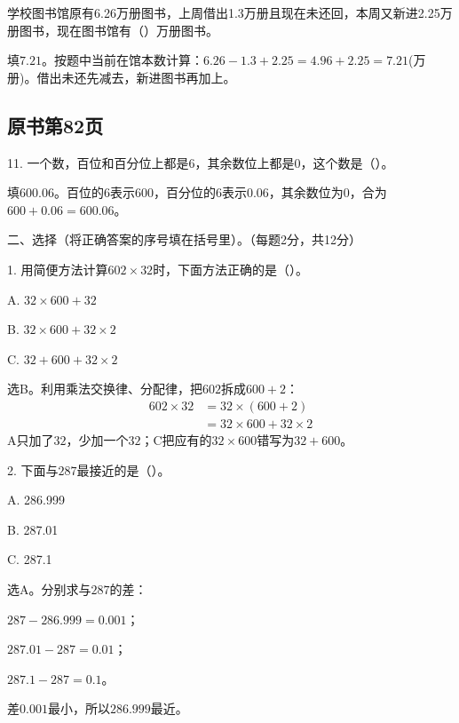 学校图书馆原有6.26万册图书，上周借出1.3万册且现在未还回，本周又新进2.25万册图书，现在图书馆有（\hspace{1.8em}）万册图书。\par
\begin{BookAnswer}
填\(7.21\)。按题中当前在馆本数计算：\(6.26-1.3+2.25=4.96+2.25=7.21\)(万册)。借出未还先减去，新进图书再加上。
\end{BookAnswer}



\subsection*{原书第82页}

11. 一个数，百位和百分位上都是\(6\)，其余数位上都是\(0\)，这个数是（\hspace{1.8em}）。\par
\begin{BookAnswer}
填\(600.06\)。百位的\(6\)表示\(600\)，百分位的\(6\)表示\(0.06\)，其余数位为\(0\)，合为\(600+0.06=600.06\)。
\end{BookAnswer}

二、选择（将正确答案的序号填在括号里）。（每题2分，共12分）\par 1. 用简便方法计算\(602\times32\)时，下面方法正确的是（\hspace{1.8em}）。\par
\noindent A. \(32\times600+32\)\par
\noindent B. \(32\times600+32\times2\)\par
\noindent C. \(32+600+32\times2\)\par
\begin{BookAnswer}
选B。利用乘法交换律、分配律，把\(602\)拆成\(600+2\)：\[\begin{aligned}602\times32&=32\times(600+2)\\&=32\times600+32\times2\end{aligned}\]A只加了\(32\)，少加一个\(32\)；C把应有的\(32\times600\)错写为\(32+600\)。
\end{BookAnswer}

2. 下面与\(287\)最接近的是（\hspace{1.8em}）。\par
\noindent A. 286.999\par
\noindent B. 287.01\par
\noindent C. 287.1\par
\begin{BookAnswer}
选A。分别求与\(287\)的差：\par \(287-286.999=0.001\)；\par \(287.01-287=0.01\)；\par \(287.1-287=0.1\)。\par 差\(0.001\)最小，所以\(286.999\)最近。
\end{BookAnswer}

